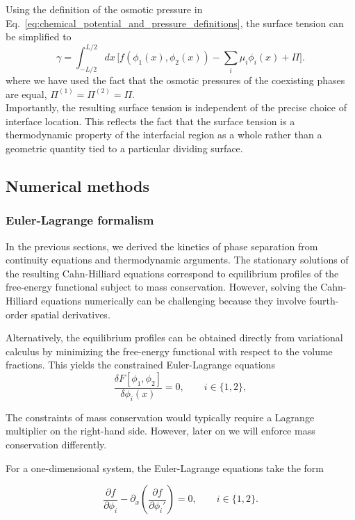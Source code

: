 \documentclass[12pt]{article}
\begin{document}
Using the definition of the osmotic pressure in Eq.~\eqref{eq:chemical_potential_and_pressure_definitions}, the surface tension can be simplified to
\begin{equation}
\gamma
=
\int_{-L/2}^{L/2} dx\,
\bigg[
f(\phi_1(x),\phi_2(x)) 
-\sum_i \mu_i \phi_i(x) +\Pi
\bigg].
\label{eq:surfacetension_flory}
\end{equation}
where we have used the fact that the osmotic pressures of the coexisting phases are equal, \(\Pi^{(1)} = \Pi^{(2)} = \Pi\).\\
Importantly, the resulting surface tension is independent of the precise choice of interface location. This reflects the fact that the surface tension is a thermodynamic property of the interfacial region as a whole rather than a geometric quantity tied to a particular dividing surface.



\subsection{Numerical methods}

\subsubsection{Euler-Lagrange formalism}

In the previous sections, we derived the kinetics of phase separation from continuity equations and thermodynamic arguments. The stationary solutions of the resulting Cahn-Hilliard equations correspond to equilibrium profiles of the free-energy functional subject to mass conservation. However, solving the Cahn-Hilliard equations numerically can be challenging because they involve fourth-order spatial derivatives.

Alternatively, the equilibrium profiles can be obtained directly from variational calculus by minimizing the free-energy functional with respect to the volume fractions.
This yields the constrained Euler-Lagrange equations 
\[
\frac{\delta F[\phi_1,\phi_2]}{\delta \phi_i(x)} = 0,
\qquad i\in\{1,2\},
\]

The constraints of mass conservation would typically require a Lagrange multiplier on the right-hand side. However, later on we will enforce mass conservation differently.

For a one-dimensional system, the Euler-Lagrange equations take the form

\[
\frac{\partial f}{\partial \phi_i}
-
\partial_x\!\left(\frac{\partial f}{\partial \phi_i'}\right)
=0,
\qquad i\in\{1,2\}.
\]
\end{document}
